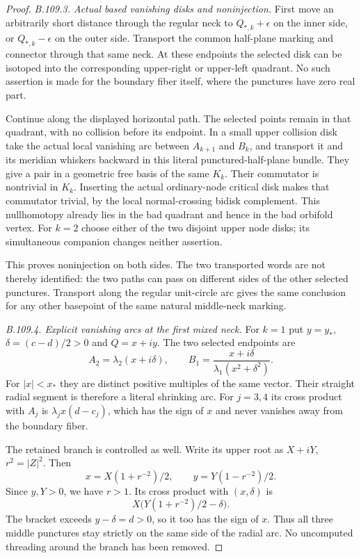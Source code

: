 \begin{proof}
\emph{B.109.3. Actual based vanishing disks and noninjection.}
First move an arbitrarily short distance through the regular neck
to $Q_{*,k}+\epsilon$ on the inner side, or
$Q_{*,k}-\epsilon$ on the outer side. Transport the common
half-plane marking and connector through that same neck. At these
endpoints the selected disk can be isotoped into the corresponding
upper-right or upper-left quadrant. No such assertion is made for
the boundary fiber itself, where the punctures have zero real part.

Continue along the displayed horizontal path. The selected points
remain in that quadrant, with no collision before its endpoint.
In a small upper collision disk take the actual local vanishing
arc between $A_{k+1}$ and $B_k$, and transport it and its meridian
whiskers backward in this literal punctured-half-plane bundle.
They give a pair in a geometric free basis of the same $K_k$.
Their commutator is nontrivial in $K_k$. Inserting the actual
ordinary-node critical disk makes that commutator trivial, by
the local normal-crossing bidisk complement. This nullhomotopy
already lies in the bad quadrant and hence in the bad orbifold
vertex. For $k=2$ choose either of the two disjoint upper node
disks; its simultaneous companion changes neither assertion.

This proves noninjection on both sides. The two transported words
are not thereby identified: the two paths can pass on different
sides of the other selected punctures. Transport along the regular
unit-circle arc gives the same conclusion for any other basepoint
of the same natural middle-neck marking.

\emph{B.109.4. Explicit vanishing arcs at the first mixed neck.}
For $k=1$ put $y=y_*$, $\delta=(c-d)/2>0$ and $Q=x+iy$.
The two selected endpoints are
\[
 A_2=\lambda_2(x+i\delta),\qquad
 B_1=\frac{x+i\delta}{\lambda_1(x^2+\delta^2)}.
\]
For $|x|<x_*$ they are distinct positive multiples of the same
vector. Their straight radial segment is therefore a literal
shrinking arc. For $j=3,4$ its cross product with $A_j$ is
$\lambda_jx(d-c_j)$, which has the sign of $x$ and never vanishes
away from the boundary fiber.

The retained branch is controlled as well. Write its upper root
as $X+iY$, $r^2=|Z|^2$. Then
\[
 x=X(1+r^{-2})/2,\qquad y=Y(1-r^{-2})/2.
\]
Since $y,Y>0$, we have $r>1$. Its cross product with
$(x,\delta)$ is
\[
 X\bigl(Y(1+r^{-2})/2-\delta\bigr).
\]
The bracket exceeds $y-\delta=d>0$, so it too has the sign of
$x$. Thus all three middle punctures stay strictly on the same
side of the radial arc. No uncomputed threading around the branch
has been removed.


\end{proof}
